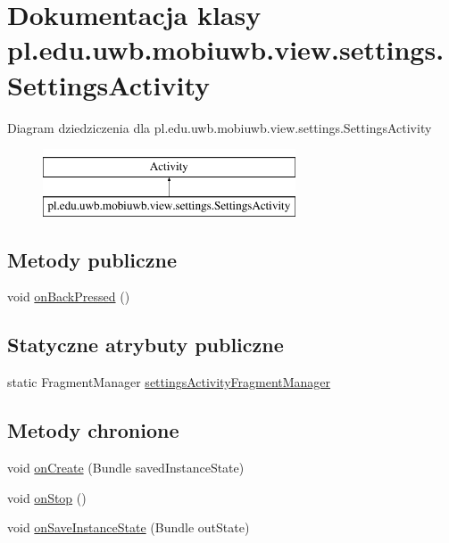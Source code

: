 \hypertarget{classpl_1_1edu_1_1uwb_1_1mobiuwb_1_1view_1_1settings_1_1_settings_activity}{}\section{Dokumentacja klasy pl.\+edu.\+uwb.\+mobiuwb.\+view.\+settings.\+Settings\+Activity}
\label{classpl_1_1edu_1_1uwb_1_1mobiuwb_1_1view_1_1settings_1_1_settings_activity}
Diagram dziedziczenia dla pl.\+edu.\+uwb.\+mobiuwb.\+view.\+settings.\+Settings\+Activity\begin{figure}[H]
\begin{center}
\leavevmode
\includegraphics[height=2.000000cm]{classpl_1_1edu_1_1uwb_1_1mobiuwb_1_1view_1_1settings_1_1_settings_activity}
\end{center}
\end{figure}
\subsection*{Metody publiczne}
\begin{DoxyCompactItemize}
\item 
void \hyperlink{classpl_1_1edu_1_1uwb_1_1mobiuwb_1_1view_1_1settings_1_1_settings_activity_a20b602267a9b77dc903706dc6cb73635}{on\+Back\+Pressed} ()
\end{DoxyCompactItemize}
\subsection*{Statyczne atrybuty publiczne}
\begin{DoxyCompactItemize}
\item 
static Fragment\+Manager \hyperlink{classpl_1_1edu_1_1uwb_1_1mobiuwb_1_1view_1_1settings_1_1_settings_activity_a09a9e46831f553a89ca549e04770794c}{settings\+Activity\+Fragment\+Manager}
\end{DoxyCompactItemize}
\subsection*{Metody chronione}
\begin{DoxyCompactItemize}
\item 
void \hyperlink{classpl_1_1edu_1_1uwb_1_1mobiuwb_1_1view_1_1settings_1_1_settings_activity_abbe69c1ee3b61d2081becdb501c32308}{on\+Create} (Bundle saved\+Instance\+State)
\item 
void \hyperlink{classpl_1_1edu_1_1uwb_1_1mobiuwb_1_1view_1_1settings_1_1_settings_activity_addeab63a366c1055230591e3b79bfabe}{on\+Stop} ()
\item 
void \hyperlink{classpl_1_1edu_1_1uwb_1_1mobiuwb_1_1view_1_1settings_1_1_settings_activity_af439cc7f2efd733b5aff49fadc0a2e5e}{on\+Save\+Instance\+State} (Bundle out\+State)
\end{DoxyCompactItemize}


